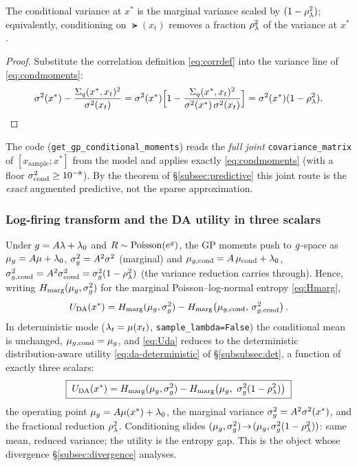 \begin{proposition}\label{prop:fracvar}
The conditional variance at $x^*$ is the marginal variance scaled by
$(1-\rho_{\lambda}^2)$; equivalently, conditioning on $\lat(x_t)$ removes a fraction
$\rho_{\lambda}^2$ of the variance at $x^*$.
\end{proposition}
\begin{proof}
Substitute the correlation definition \eqref{eq:corrdef} into the variance line
of \eqref{eq:condmoments}:
\[
  \sigma^{2}(x^*)-\frac{\Sigma_q(x^*,x_t)^2}{\sigma^{2}(x_t)}
  =\sigma^{2}(x^*)\Bigl[1-\frac{\Sigma_q(x^*,x_t)^2}{\sigma^{2}(x^*)\,\sigma^{2}(x_t)}\Bigr]
  =\sigma^{2}(x^*)(1-\rho_{\lambda}^2).
\]
\end{proof}

The code (\texttt{get\_\allowbreak gp\_\allowbreak conditional\_\allowbreak moments}) reads the \emph{full joint}
\texttt{covariance\_\allowbreak matrix} of $[x_{\text{sample}};x^*]$ from the model and applies
exactly \eqref{eq:condmoments} (with a floor $\sigma^{2}_{\mathrm{cond}}\ge10^{-8}$).
By the theorem of \S\ref{subsec:predictive} this joint route is the \emph{exact}
augmented predictive, not the sparse approximation.

\subsubsection{Log-firing transform and the DA utility in three scalars}
Under $g=A\lambda+\lambda_{0}$ and $R\sim\mathrm{Poisson}(e^{g})$, the GP moments push to
$g$-space as $\mu_{g}=A\mu+\lambda_{0}$, $\sigma_{g}^{2}=A^2\sigma^{2}$ (marginal) and
$\mu_{g,\mathrm{cond}}=A\,\mu_{\mathrm{cond}}+\lambda_{0}$,
$\sigma^{2}_{g,\mathrm{cond}}=A^2\sigma^{2}_{\mathrm{cond}}=\sigma_{g}^{2}(1-\rho_{\lambda}^2)$
(the variance reduction carries through). Hence, writing
$H_{\mathrm{marg}}(\mu_{g},\sigma_{g}^{2})$ for the marginal Poisson--log-normal entropy \eqref{eq:Hmarg},
\[
  U_{\mathrm{DA}}(x^*)=H_{\mathrm{marg}}(\mu_{g},\sigma_{g}^{2})-H_{\mathrm{marg}}\!\left(\mu_{g,\mathrm{cond}},\,\sigma^{2}_{g,\mathrm{cond}}\right).
\]
In deterministic mode ($\lambda_t=\mu(x_t)$, \texttt{sample\_\allowbreak lambda=False}) the
conditional mean is unchanged, $\mu_{g,\mathrm{cond}}=\mu_{g}$, and \eqref{eq:Uda}
reduces to the deterministic distribution-aware utility \eqref{eq:da-deterministic}
of \S\ref{subsubsec:det}, a function of exactly three scalars:
\begin{equation}\label{eq:daboxed}
  \boxed{\;\Uda(x^*)=\Hmarg(\mug,\varg)-\Hmarg\!\left(\mug,\ \varg(1-\corr^2)\right)\;}
\end{equation}
the operating point $\mu_{g}=A\mu(x^*)+\lambda_{0}$, the marginal variance
$\sigma_{g}^{2}=A^2\sigma^{2}(x^*)$, and the fractional reduction $\rho_{\lambda}^2$. Conditioning
slides $(\mu_{g},\sigma_{g}^{2})\!\to\!(\mu_{g},\sigma_{g}^{2}(1-\rho_{\lambda}^2))$: same mean, reduced variance;
the utility is the entropy gap. This is the object whose divergence
\S\ref{subsec:divergence} analyses.

